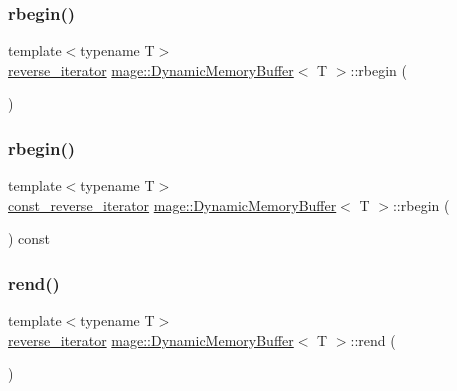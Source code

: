 \subsubsection{\texorpdfstring{rbegin()}{rbegin()}\hspace{0.1cm}{\footnotesize\ttfamily [1/2]}}
{\footnotesize\ttfamily template$<$typename T$>$ \\
\mbox{\hyperlink{classmage_1_1_dynamic_memory_buffer_ae87c651c2de7410a9af6ed723cea3811}{reverse\+\_\+iterator}} \mbox{\hyperlink{classmage_1_1_dynamic_memory_buffer}{mage\+::\+Dynamic\+Memory\+Buffer}}$<$ T $>$\+::rbegin (\begin{DoxyParamCaption}{ }\end{DoxyParamCaption})\hspace{0.3cm}{\ttfamily [noexcept]}}

\mbox{\label{classmage_1_1_dynamic_memory_buffer_abd2ef9a418d2854dde4115034cd6c35d}} 
\subsubsection{\texorpdfstring{rbegin()}{rbegin()}\hspace{0.1cm}{\footnotesize\ttfamily [2/2]}}
{\footnotesize\ttfamily template$<$typename T$>$ \\
\mbox{\hyperlink{classmage_1_1_dynamic_memory_buffer_a962256bdb2b82436843d71ade7e4d7ee}{const\+\_\+reverse\+\_\+iterator}} \mbox{\hyperlink{classmage_1_1_dynamic_memory_buffer}{mage\+::\+Dynamic\+Memory\+Buffer}}$<$ T $>$\+::rbegin (\begin{DoxyParamCaption}{ }\end{DoxyParamCaption}) const\hspace{0.3cm}{\ttfamily [noexcept]}}

\mbox{\label{classmage_1_1_dynamic_memory_buffer_a4d0d760987cf0e8984e2276a2770a39e}} 
\subsubsection{\texorpdfstring{rend()}{rend()}\hspace{0.1cm}{\footnotesize\ttfamily [1/2]}}
{\footnotesize\ttfamily template$<$typename T$>$ \\
\mbox{\hyperlink{classmage_1_1_dynamic_memory_buffer_ae87c651c2de7410a9af6ed723cea3811}{reverse\+\_\+iterator}} \mbox{\hyperlink{classmage_1_1_dynamic_memory_buffer}{mage\+::\+Dynamic\+Memory\+Buffer}}$<$ T $>$\+::rend (\begin{DoxyParamCaption}{ }\end{DoxyParamCaption})\hspace{0.3cm}{\ttfamily [noexcept]}}

